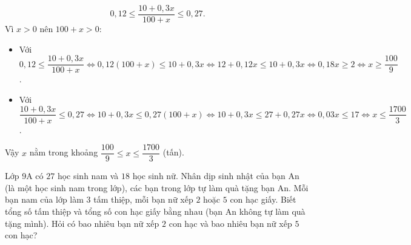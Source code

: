 \begin{bt}
{\begin{enumerate}[a)]
	$$0{,}12 \le \dfrac{10 + 0{,}3x}{100 + x} \le 0{,}27.$$
	Vì $x > 0$ nên $100 + x > 0$:
	\begin{itemize}
		\item Với $0{,}12 \le \dfrac{10 + 0{,}3x}{100 + x} \iff 0{,}12(100 + x) \le 10 + 0{,}3x \iff 12 + 0{,}12x \le 10 + 0{,}3x \iff 0{,}18x \ge 2 \iff x \ge \dfrac{100}{9}$.
		\item Với $\dfrac{10 + 0{,}3x}{100 + x} \le 0{,}27 \iff 10 + 0{,}3x \le 0{,}27(100 + x) \iff 10 + 0{,}3x \le 27 + 0{,}27x \iff 0{,}03x \le 17 \iff x \le \dfrac{1700}{3}$.
	\end{itemize}
	Vậy $x$ nằm trong khoảng $\dfrac{100}{9} \le x \le \dfrac{1700}{3}$ (tấn).
\end{enumerate}
}
\end{bt}


\begin{bt}%
Lớp 9A có $27$ học sinh nam và $18$ học sinh nữ. Nhân dịp sinh nhật của bạn An (là một học sinh nam trong lớp), các bạn trong lớp tự làm quà tặng bạn An. Mỗi bạn nam của lớp làm $3$ tấm thiệp, mỗi bạn nữ xếp $2$ hoặc $5$ con hạc giấy. Biết tổng số tấm thiệp và tổng số con hạc giấy bằng nhau (bạn An không tự làm quà tặng mình). Hỏi có bao nhiêu bạn nữ xếp $2$ con hạc và bao nhiêu bạn nữ xếp $5$ con hạc?
\end{bt}

